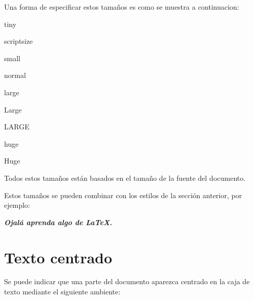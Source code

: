 \documentclass[letterpaper,12pt]{article}
\begin{document}
Una forma de especificar estos tamaños es como se muestra a continuacion:

{\tiny tiny} %

{\scriptsize scriptsize}

{\small small}

{\normalsize normal}

{\large large}

{\Large Large}

{\LARGE LARGE}

{\huge huge}

{\Huge Huge}

Todos estos tamaños están basados en el tamaño de la fuente del documento.

Estos tamaños se pueden combinar con los estilos de la sección anterior, por ejemplo:

\begin{Large}
\textbf{\textit{Ojalá aprenda algo de \LaTeX.}}
\end{Large}

\section{Texto centrado}

Se puede indicar que una parte del documento aparezca centrado en la caja de texto mediante el siguiente ambiente:
\end{document}
